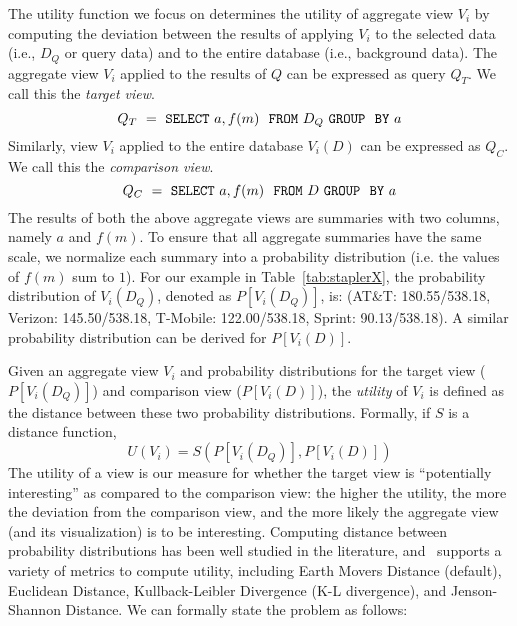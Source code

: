 The utility function we focus on determines the utility of aggregate view $V_i$
by computing the deviation between the results of applying $V_i$ to the 
selected data (i.e., $D_Q$ or query data) and to the entire database (i.e., background data).
The aggregate view $V_i$ applied to the results of $Q$ can be expressed as query $Q_T$. 
We call this the {\em target view}.
$$ Q_T\ =\ {\tt SELECT \ } a, f(m) \ \ {\tt FROM} \  D_Q\  {\tt GROUP \ \ BY} \ a$$ 
Similarly, view $V_i$ applied to the entire database $V_i (D)$ can be expressed as $Q_C$. 
We call this the {\em comparison view}. 
$$ Q_C\ =\ {\tt SELECT \ } a, f(m) \ \ {\tt FROM} \  D\  {\tt GROUP \ \ BY} \ a$$
The results of both the above aggregate views are summaries with two columns, namely $a$ and
$f(m)$. 
To ensure that all aggregate summaries have the same scale, we normalize each 
summary into a probability distribution (i.e. the values of $f(m)$ sum to $1$).
For our example in Table~\ref{tab:staplerX}, the probability distribution of
$V_i(D_Q)$, denoted as $P[V_i (D_Q)]$, is: (AT\&T: 180.55/538.18, Verizon:
145.50/538.18, T-Mobile: 122.00/538.18,  Sprint: 90.13/538.18). 
A similar probability distribution can be derived for $P[V_i (D)]$.

Given an aggregate view $V_i$ and probability distributions for the
target view  ($P[V_i (D_Q)]$) and comparison view ($P[V_i (D)]$), the
{\em utility} of $V_i$ is defined as the distance between these two probability
distributions. Formally, if $S$ is a distance function,
$$ U (V_i) = S ( P[V_i (D_Q)], P[V_i (D)] )$$
The utility of a view is our measure for whether the target view is
``potentially interesting'' as compared to the comparison view:
the higher the utility, the more the deviation
from the comparison view, and the more likely the aggregate view (and its visualization) is to be interesting.
Computing distance between probability distributions has
been well studied in the literature, and \SeeDB\ supports a variety of metrics
to compute utility, including Earth Movers Distance (default), 
Euclidean Distance, Kullback-Leibler Divergence (K-L
divergence), and Jenson-Shannon
Distance. 
We can formally state the \SeeDB problem as follows:

